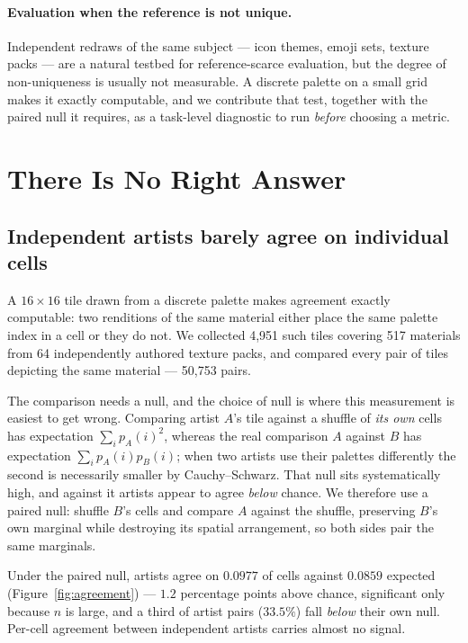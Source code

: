 \documentclass{article}
\begin{document}
\paragraph{Evaluation when the reference is not unique.} Independent redraws
of the same subject --- icon themes, emoji sets, texture packs --- are a
natural testbed for reference-scarce evaluation, but the degree of
non-uniqueness is usually not measurable. A discrete palette on a small grid
makes it exactly computable, and we contribute that test, together with the
paired null it requires, as a task-level diagnostic to run \emph{before}
choosing a metric.


\section{There Is No Right Answer}
\label{sec:noright}

\subsection{Independent artists barely agree on individual cells}
\label{sec:agreement}

A $16\times16$ tile drawn from a discrete palette makes agreement exactly
computable: two renditions of the same material either place the same palette
index in a cell or they do not. We collected 4{,}951 such tiles covering 517
materials from 64 independently authored texture packs, and compared every
pair of tiles depicting the same material --- 50{,}753 pairs.

The comparison needs a null, and the choice of null is where this measurement
is easiest to get wrong. Comparing artist $A$'s tile against a shuffle of
\emph{its own} cells has expectation $\sum_i p_A(i)^2$, whereas the real
comparison $A$ against $B$ has expectation $\sum_i p_A(i)p_B(i)$; when two
artists use their palettes differently the second is necessarily smaller by
Cauchy--Schwarz. That null sits systematically high, and against it artists
appear to agree \emph{below} chance. We therefore use a paired null: shuffle
$B$'s cells and compare $A$ against the shuffle, preserving $B$'s own marginal
while destroying its spatial arrangement, so both sides pair the same
marginals.

Under the paired null, artists agree on $0.0977$ of cells against $0.0859$
expected (Figure~\ref{fig:agreement}) --- $1.2$ percentage points above
chance, significant only because $n$ is large, and a third of artist pairs
($33.5\%$) fall \emph{below} their own null. Per-cell agreement between
independent artists carries almost no signal.
\end{document}
